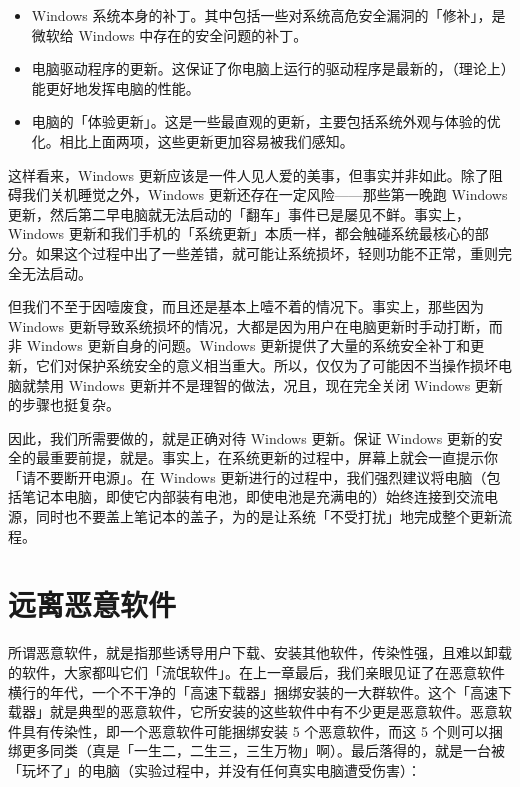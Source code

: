 \begin{itemize}
  \item Windows 系统本身的补丁。其中包括一些对系统高危安全漏洞的「修补」，是微软给 Windows 中存在的安全问题的补丁。
  \item 电脑驱动程序的更新。这保证了你电脑上运行的驱动程序是最新的，（理论上）能更好地发挥电脑的性能。
  \item 电脑的「体验更新」。这是一些最直观的更新，主要包括系统外观与体验的优化。相比上面两项，这些更新更加容易被我们感知。
\end{itemize}

这样看来，Windows 更新应该是一件人见人爱的美事，但事实并非如此。除了阻碍我们关机睡觉之外，Windows 更新还存在一定风险——那些第一晚跑 Windows 更新，然后第二早电脑就无法启动的「翻车」事件已是屡见不鲜。事实上，Windows 更新和我们手机的「系统更新」本质一样，都会触碰系统最核心的部分。如果这个过程中出了一些差错，就可能让系统损坏，轻则功能不正常，重则完全无法启动。

但我们不至于因噎废食，而且还是基本上噎不着的情况下。事实上，那些因为 Windows 更新导致系统损坏的情况，大都是因为用户在电脑更新时手动打断，而非 Windows 更新自身的问题。Windows 更新提供了大量的系统安全补丁和更新，它们对保护系统安全的意义相当重大。所以，仅仅为了可能因不当操作损坏电脑就禁用 Windows 更新并不是理智的做法，况且，现在完全关闭 Windows 更新的步骤也挺复杂。

因此，我们所需要做的，就是正确对待 Windows 更新。保证 Windows 更新的安全的最重要前提，就是。事实上，在系统更新的过程中，屏幕上就会一直提示你「请不要断开电源」。在 Windows 更新进行的过程中，我们强烈建议将电脑（包括笔记本电脑，即使它内部装有电池，即使电池是充满电的）始终连接到交流电源，同时也不要盖上笔记本的盖子，为的是让系统「不受打扰」地完成整个更新流程。

\section{远离恶意软件}

所谓恶意软件，就是指那些诱导用户下载、安装其他软件，传染性强，且难以卸载的软件，大家都叫它们「流氓软件」。在上一章最后，我们亲眼见证了在恶意软件横行的年代，一个不干净的「高速下载器」捆绑安装的一大群软件。这个「高速下载器」就是典型的恶意软件，它所安装的这些软件中有不少更是恶意软件。恶意软件具有传染性，即一个恶意软件可能捆绑安装 5 个恶意软件，而这 5 个则可以捆绑更多同类（真是「一生二，二生三，三生万物」啊）。最后落得的，就是一台被「玩坏了」的电脑（实验过程中，并没有任何真实电脑遭受伤害）：

